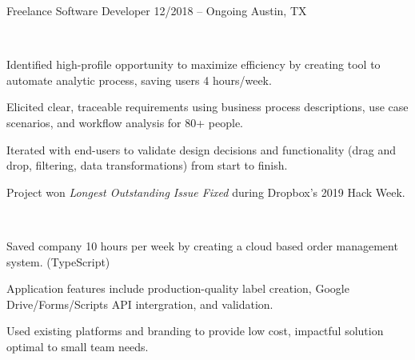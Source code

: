 \newcommand*{\cphbevts}{\href{https://cphb-events.public-health.uiowa.edu/}{\textit{CPHB-Events}}}

\begin{cventries}

  \cventry
    {Freelance}                       %
    {Software Developer}              %
    {12/2018 – Ongoing}               %
    {Austin, TX}                      %
    { 
      \begin{cvitems}                 %
        \item {\\
          \begin{projectitems}
            \item [\textendash] {Identified high-profile opportunity to maximize efficiency by creating tool to automate analytic process, saving users 4 hours/week.}
            \item [\textendash] {Elicited clear, traceable requirements using business process descriptions, use case scenarios, and workflow analysis for 80+ people.}
            \item [\textendash] {Iterated with end-users to validate design decisions and functionality (drag and drop, filtering, data transformations) from start to finish.}
            \item [\textendash] {Project won \textit{Longest Outstanding Issue Fixed} during Dropbox's 2019 Hack Week.}
          \end{projectitems}
        }
        \item {\\
          \begin{projectitems}
            \item [\textendash] {Saved company 10 hours per week by creating a cloud based order management system. (TypeScript)}
            \item [\textendash] {Application features include production-quality label creation, Google Drive/Forms/Scripts API intergration, and validation.}
            \item [\textendash] {Used existing platforms and branding to provide low cost, impactful solution optimal to small team needs.}
          \end{projectitems}
        }
      \end{cvitems}
      \vspace{-1.0mm}
  }


\end{cventries}
